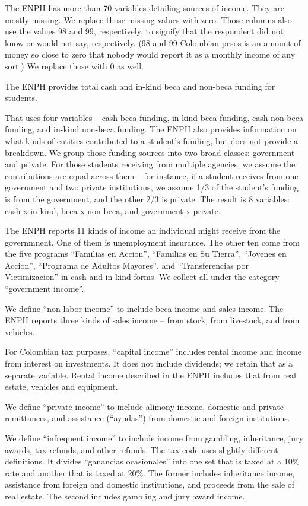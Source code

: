 \documentclass[12pt]{article}
\begin{document}
\begin{appendices}
The ENPH has more than 70 variables detailing sources of income.
They are mostly missing.
We replace those missing values with zero.
Those columns also use the values 98 and 99, respectively,
to signify that the respondent did not know or would not say, respectively.
(98 and 99 Colombian pesos is an amount of money so close to zero
that nobody would report it as a monthly income of any sort.)
We replace those with 0 as well.

The ENPH provides total cash and in-kind beca and non-beca funding for students.
\iffalse
[[LUIS: How can I explain the difference between beca and non-beca funding?]]
\fi
That uses four variables --
cash beca funding, in-kind beca funding, cash non-beca funding, and in-kind non-beca funding.
The ENPH also provides information on
what kinds of entities contributed to a student's funding,
but does not provide a breakdown.
We group those funding sources into two broad classes: government and private.
For those students receiving from multiple agencies,
we assume the contributions are equal across them -- for instance,
if a student receives from one government and two private institutions,
we assume 1/3 of the student's funding is from the government,
and the other 2/3 is private.
The result is 8 variables:
cash x in-kind, beca x non-beca, and government x private.

The ENPH reports 11 kinds of income
an individual might receive from the governmnent.
One of them is unemployment insurance.
The other ten come from the five programs
``Familias en Accion'',
``Familias en Su Tierra'',
``Jovenes en Accion'',
``Programa de Adultos Mayores'', and
``Transferencias por Victimizacion''
in cash and in-kind forms.
We collect all under the category ``government income''.

We define ``non-labor income'' to include beca income and sales income.
The ENPH reports three kinds of sales income --
from stock, from livestock, and from vehicles.

For Colombian tax purposes, ``capital income''
includes rental income and income from interest on investments.
It does not include dividends; we retain that as a separate variable.
Rental income described in the ENPH includes that from
real estate, vehicles and equipment.

We define ``private income'' to include
alimony income, domestic and private remittances, and
assistance (``ayudas'') from domestic and foreign institutions.

We define ``infrequent income'' to include income from
gambling, inheritance, jury awards, tax refunds, and other refunds.
The tax code uses slightly different definitions.
It divides ``ganancias ocasionales'' into
one set that is taxed at a 10\% rate
and another that is taxed at 20\%.
The former includes inheritance income,
assistance from foreign and domestic institutions,
and proceeds from the sale of real estate.
The second includes gambling and jury award income.


\end{appendices}
\end{document}
